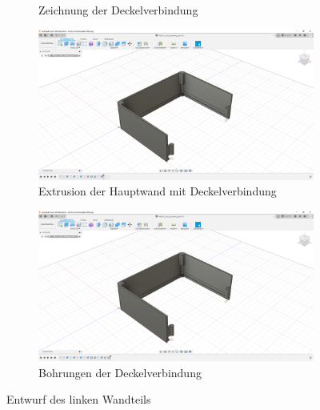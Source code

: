 \begin{figure}[h!tb]
\begin{subfigure}[t]{.3\linewidth}
		\caption[Zeichnung der Deckelverbindung]{Zeichnung der Deckelverbindung}
		\label{fig:design-left-09}
	\end{subfigure}
	\begin{subfigure}[t]{.3\linewidth}
		\includegraphics[width=\linewidth]{img/konstruktion_gehaeuse_links_010.png}
		\caption[Extrusion der Hauptwand mit Deckelverbindung]{Extrusion der Hauptwand mit Deckelverbindung}
		\label{fig:design-left-10}
	\end{subfigure}
	\begin{subfigure}[t]{.3\linewidth}
		\includegraphics[width=\linewidth]{img/konstruktion_gehaeuse_links_011.png}
		\caption[Bohrungen der Deckelverbindung]{Bohrungen der Deckelverbindung}
		\label{fig:design-left-11}
	\end{subfigure}
	\caption[Entwurf des linken Wandteils]{Entwurf des linken Wandteils}
	\label{fig:design-left}
\end{figure}\par
